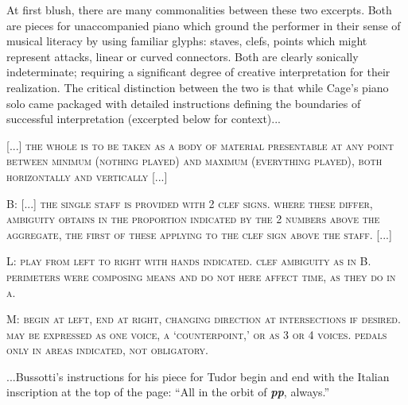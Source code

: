         At first blush, there are many commonalities between these two excerpts. Both are pieces for unaccompanied piano which ground the performer in their sense of musical literacy by using familiar glyphs: staves, clefs, points which might represent attacks, linear or curved connectors. Both are clearly sonically indeterminate; requiring a significant degree of creative interpretation for their realization. The critical distinction between the two is that while Cage's piano solo came packaged with detailed instructions defining the boundaries of successful interpretation (excerpted below for context)...

    \begin{smallquote}
        \noindent \textsc{[...] the whole is to be taken as a body of material presentable at any point between minimum (nothing played) and maximum (everything played), both horizontally and vertically [...]}
    \end{smallquote}
        \vspace{-20pt}
    \begin{smallquote}
        \noindent \lettrine[lines=2, findent=3pt, nindent=0pt]{B}{:} \textsc{[...] the single staff is provided with 2 clef signs. where these differ, ambiguity obtains in the proportion indicated by the 2 numbers above the aggregate, the first of these applying to the clef sign above the staff.} [...]
    \end{smallquote}
        \vspace{-20pt}
    \begin{smallquote}
        \noindent \lettrine[lines=2, findent=3pt, nindent=0pt]{L}{:} \textsc{play from left to right with hands indicated. clef ambiguity as in B. perimeters were composing means and do not here affect time, as they do in a.}        
    \end{smallquote}
        \vspace{-20pt}
    \begin{smallquote}
        \noindent \lettrine[lines=2, findent=3pt, nindent=0pt]{M}{:} \textsc{begin at left, end at right, changing direction at intersections if desired. may be expressed as one voice, a `counterpoint,' or as 3 or 4 voices. pedals only in areas indicated, not obligatory.}\autocite[pg. B]{Cage_1960}
    \end{smallquote}

    \noindent ...Bussotti's instructions for his piece for Tudor begin and end with the Italian inscription at the top of the page: ``All in the orbit of \textbf{\textit{pp}}, always.'' 
    
